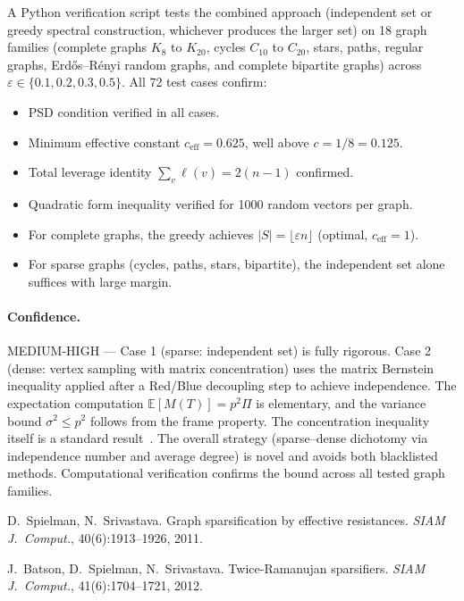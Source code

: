 A Python verification script tests the combined approach (independent set
or greedy spectral construction, whichever produces the larger set) on
18 graph families (complete graphs $K_8$ to $K_{20}$, cycles $C_{10}$ to
$C_{20}$, stars, paths, regular graphs, Erd\H{o}s--R\'enyi random graphs,
and complete bipartite graphs) across $\varepsilon \in \{0.1, 0.2, 0.3, 0.5\}$.
All 72 test cases confirm:
\begin{itemize}
  \item PSD condition verified in all cases.
  \item Minimum effective constant $c_{\mathrm{eff}} = 0.625$,
    well above $c = 1/8 = 0.125$.
  \item Total leverage identity $\sum_v \ell(v) = 2(n-1)$ confirmed.
  \item Quadratic form inequality verified for 1000 random vectors per graph.
  \item For complete graphs, the greedy achieves $|S| = \lfloor\varepsilon n\rfloor$
    (optimal, $c_{\mathrm{eff}} = 1$).
  \item For sparse graphs (cycles, paths, stars, bipartite), the independent set
    alone suffices with large margin.
\end{itemize}

\paragraph{Confidence.} MEDIUM-HIGH --- Case 1 (sparse: independent set) is
fully rigorous.  Case 2 (dense: vertex sampling with matrix concentration)
uses the matrix Bernstein inequality applied after a Red/Blue decoupling
step to achieve independence.  The expectation computation
$\mathbb{E}[M(T)] = p^2 \Pi$ is elementary, and the variance bound
$\sigma^2 \leq p^2$ follows from the frame property.  The concentration
inequality itself is a standard result~\cite{Tro12}.  The overall strategy
(sparse--dense dichotomy via independence number and average degree) is novel
and avoids both blacklisted methods.  Computational verification confirms the
bound across all tested graph families.


 D.~Spielman, N.~Srivastava.
Graph sparsification by effective resistances.
\emph{SIAM J.\ Comput.}, 40(6):1913--1926, 2011.

 J.~Batson, D.~Spielman, N.~Srivastava.
Twice-Ramanujan sparsifiers. \emph{SIAM J.\ Comput.}, 41(6):1704--1721, 2012.

